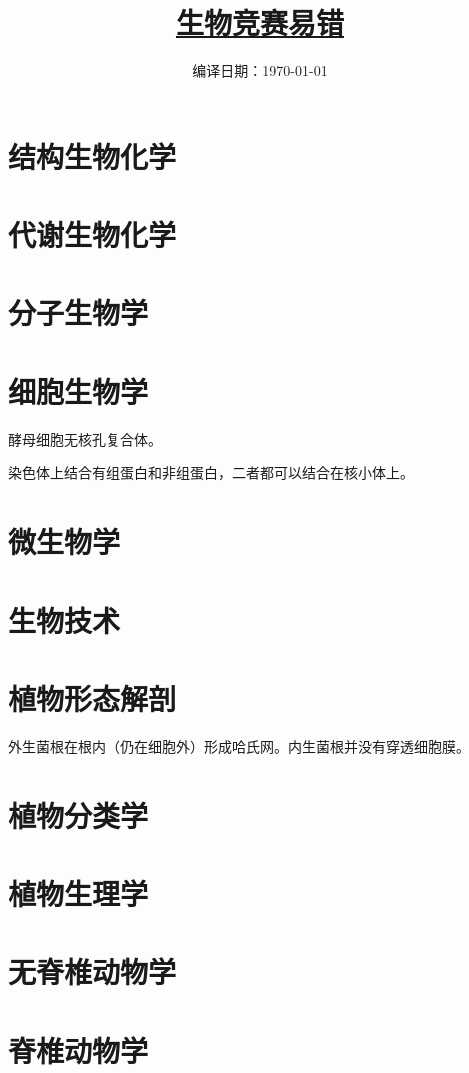 \documentclass[b5paper,zihao=-4,titlepage]{ctexart}
\title{\fontsize{40}{40} \hyperref[mulu]{\textbf{生物竞赛易错}}}
\date{编译日期：\today}
\author{}
\newcommand{\zhongdian}[1]{{\color{blue}#1}}
\begin{document}
	\maketitle
	\tableofcontents
	\label{mulu}

	\section{结构生物化学}
	\section{代谢生物化学}
	\section{分子生物学}
	\section{细胞生物学}

	酵母细胞无核孔复合体。

	染色体上结合有组蛋白和非组蛋白，\zhongdian{二者都可以结合在核小体上}。

	\section{微生物学}
	\section{生物技术}

	\section{植物形态解剖}

	外生菌根在根内（仍在细胞外）形成哈氏网。内生菌根\zhongdian{并没有穿透}细胞膜。

	\section{植物分类学}
	\section{植物生理学}

	\section{无脊椎动物学}
	\section{脊椎动物学}
\end{document}
